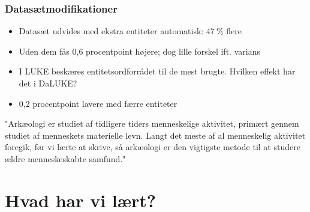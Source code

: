 \documentclass{beamer}
\newcommand{\unit}[1]{\ensuremath{\:\text{#1}}}
\newcommand{\pro}{\ensuremath{\unit{\%{}}}}
\begin{document}
\begin{frame}
    \frametitle{Datasætmodifikationer}
    \begin{itemize}
        \item Datasæt udvides med ekstra entiteter automatisk: $ 47\pro $ flere
        \item Uden dem fås 0,6 procentpoint højere; dog lille forskel ift. varians
        \item I LUKE beskæres entitetsordforrådet til de mest brugte. Hvilken effekt har det i DaLUKE?
        \item 0,2 procentpoint lavere med færre entiteter
    \end{itemize}
    \begin{example}
        "Arkæologi er studiet af tidligere tiders {\color{red}menneske}lige {\color{red}aktivitet}, primært gennem studiet af {menneske}ts materielle levn. Langt det meste af al {\color<2>{blue}menneske}lig {aktivitet} foregik, før vi lærte at skrive, så {arkæologi} er den vigtigste metode til at studere ældre {menneske}skabte samfund."
    \end{example}
\end{frame}

\section{Hvad har vi lært?}
\end{document}

